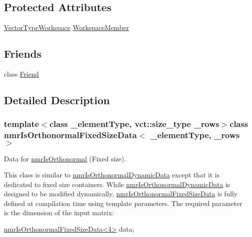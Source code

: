 \subsection*{Protected Attributes}
\begin{DoxyCompactItemize}
\item 
\hyperlink{classnmr_is_orthonormal_fixed_size_data_a9c2423d8da4e6400b83e1425454bbbe3}{Vector\+Type\+Workspace} \hyperlink{classnmr_is_orthonormal_fixed_size_data_a482c2819e75c1c6fe359e7b22b6d1a63}{Workspace\+Member}
\end{DoxyCompactItemize}
\subsection*{Friends}
\begin{DoxyCompactItemize}
\item 
class \hyperlink{classnmr_is_orthonormal_fixed_size_data_a7f8321d57e81bc613d5dbef3410ba70e}{Friend}
\end{DoxyCompactItemize}


\subsection{Detailed Description}
\subsubsection*{template$<$class \+\_\+element\+Type, vct\+::size\+\_\+type \+\_\+rows$>$class nmr\+Is\+Orthonormal\+Fixed\+Size\+Data$<$ \+\_\+element\+Type, \+\_\+rows $>$}

Data for \hyperlink{nmr_is_orthonormal_8h_acf0ff1e2dbe0c988db04d9db1e2e7697}{nmr\+Is\+Orthonormal} (Fixed size). 

This class is similar to \hyperlink{classnmr_is_orthonormal_dynamic_data}{nmr\+Is\+Orthonormal\+Dynamic\+Data} except that it is dedicated to fixed size containers. While \hyperlink{classnmr_is_orthonormal_dynamic_data}{nmr\+Is\+Orthonormal\+Dynamic\+Data} is designed to be modified dynamically, \hyperlink{classnmr_is_orthonormal_fixed_size_data}{nmr\+Is\+Orthonormal\+Fixed\+Size\+Data} is fully defined at compilation time using template parameters. The required parameter is the dimension of the input matrix\+: 
\begin{DoxyCode}
\hyperlink{classnmr_is_orthonormal_fixed_size_data}{nmrIsOrthonormalFixedSizeData<4>} data;
\end{DoxyCode}


